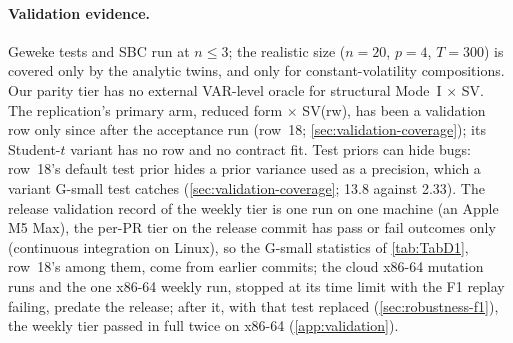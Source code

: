 \paragraph{Validation evidence.}
Geweke tests and SBC run at $n \leq 3$; the realistic size ($n = 20$, $p = 4$, $T = 300$) is
covered only by the analytic twins, and only for constant-volatility compositions. Our parity
tier has no external VAR-level oracle for structural Mode~I $\times$ SV. %
The replication's primary arm, reduced form $\times$ SV(rw), has been a validation row only since
after the acceptance run (row~18; \cref{sec:validation-coverage}); its Student-$t$ variant has no
row and no contract fit. %
Test priors can hide bugs: row~18's default test prior hides a prior variance used as a
precision, which a variant G-small test catches (\cref{sec:validation-coverage}; 13.8 against 2.33). %
The release validation record of the weekly tier is one run on one machine (an Apple M5 Max), the
per-PR tier on the release commit has pass or fail outcomes only (continuous integration on
Linux), so the G-small statistics of \cref{tab:TabD1}, row~18's among them, come from earlier
commits; the cloud x86-64 mutation runs and the one x86-64 weekly run, stopped at its time limit with
the F1 replay failing, predate the release; after it, with that test replaced
(\cref{sec:robustness-f1}), the weekly tier passed in full twice on x86-64 (\cref{app:validation}). %
